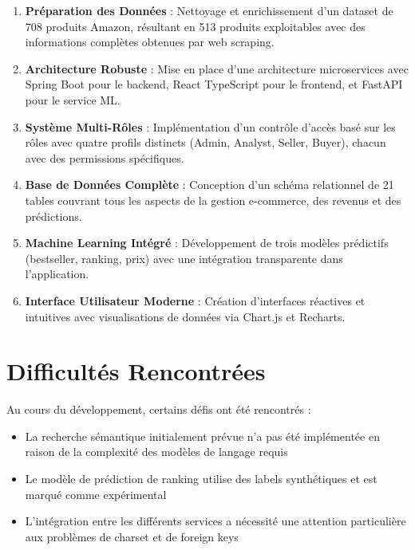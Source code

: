 \documentclass[12pt,a4paper]{report}
\begin{document}
\begin{enumerate}[noitemsep]
    \item \textbf{Préparation des Données} : Nettoyage et enrichissement d'un dataset de 708 produits Amazon, résultant en 513 produits exploitables avec des informations complètes obtenues par web scraping.

    \item \textbf{Architecture Robuste} : Mise en place d'une architecture microservices avec Spring Boot pour le backend, React TypeScript pour le frontend, et FastAPI pour le service ML.

    \item \textbf{Système Multi-Rôles} : Implémentation d'un contrôle d'accès basé sur les rôles avec quatre profils distincts (Admin, Analyst, Seller, Buyer), chacun avec des permissions spécifiques.

    \item \textbf{Base de Données Complète} : Conception d'un schéma relationnel de 21 tables couvrant tous les aspects de la gestion e-commerce, des revenus et des prédictions.

    \item \textbf{Machine Learning Intégré} : Développement de trois modèles prédictifs (bestseller, ranking, prix) avec une intégration transparente dans l'application.

    \item \textbf{Interface Utilisateur Moderne} : Création d'interfaces réactives et intuitives avec visualisations de données via Chart.js et Recharts.
\end{enumerate}

\section*{Difficultés Rencontrées}

Au cours du développement, certains défis ont été rencontrés :

\begin{itemize}[noitemsep]
    \item La recherche sémantique initialement prévue n'a pas été implémentée en raison de la complexité des modèles de langage requis
    \item Le modèle de prédiction de ranking utilise des labels synthétiques et est marqué comme expérimental
    \item L'intégration entre les différents services a nécessité une attention particulière aux problèmes de charset et de foreign keys
\end{itemize}
\end{document}
